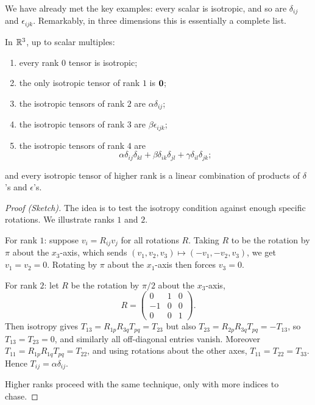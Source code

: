 \documentclass[a4paper]{scrartcl}
\begin{document}
We have already met the key examples: every scalar is isotropic, and so are $\delta_{ij}$ and $\epsilon_{ijk}$. Remarkably, in three dimensions this is essentially a complete list.

\begin{theorem}
	In $\mathbb{R}^3$, up to scalar multiples:
	\begin{enumerate}[label=(\roman*)]
		\item every rank $0$ tensor is isotropic;
		\item the only isotropic tensor of rank $1$ is $\mathbf{0}$;
		\item the isotropic tensors of rank $2$ are $\alpha \delta_{ij}$;
		\item the isotropic tensors of rank $3$ are $\beta \epsilon_{ijk}$;
		\item the isotropic tensors of rank $4$ are
		$$
		\alpha \delta_{ij}\delta_{kl} + \beta \delta_{ik}\delta_{jl} + \gamma \delta_{il}\delta_{jk};
		$$
	\end{enumerate}
	and every isotropic tensor of higher rank is a linear combination of products of $\delta$'s and $\epsilon$'s.
\end{theorem}
\begin{proof}[Proof (Sketch)]
	The idea is to test the isotropy condition against enough specific rotations. We illustrate ranks $1$ and $2$.

	For rank $1$: suppose $v_i = R_{ij}v_j$ for all rotations $R$. Taking $R$ to be the rotation by $\pi$ about the $x_3$-axis, which sends $(v_1, v_2, v_3) \mapsto (-v_1, -v_2, v_3)$, we get $v_1 = v_2 = 0$. Rotating by $\pi$ about the $x_1$-axis then forces $v_3 = 0$.

	For rank $2$: let $R$ be the rotation by $\pi/2$ about the $x_3$-axis,
	$$
	R = \begin{pmatrix}
		0 & 1 & 0 \\
		-1 & 0 & 0 \\
		0 & 0 & 1
	\end{pmatrix}.
	$$
	Then isotropy gives $T_{13} = R_{1p}R_{3q}T_{pq} = T_{23}$ but also $T_{23} = R_{2p}R_{3q}T_{pq} = -T_{13}$, so $T_{13} = T_{23} = 0$, and similarly all off-diagonal entries vanish. Moreover $T_{11} = R_{1p}R_{1q}T_{pq} = T_{22}$, and using rotations about the other axes, $T_{11} = T_{22} = T_{33}$. Hence $T_{ij} = \alpha \delta_{ij}$.

	Higher ranks proceed with the same technique, only with more indices to chase.
\end{proof}
\end{document}

